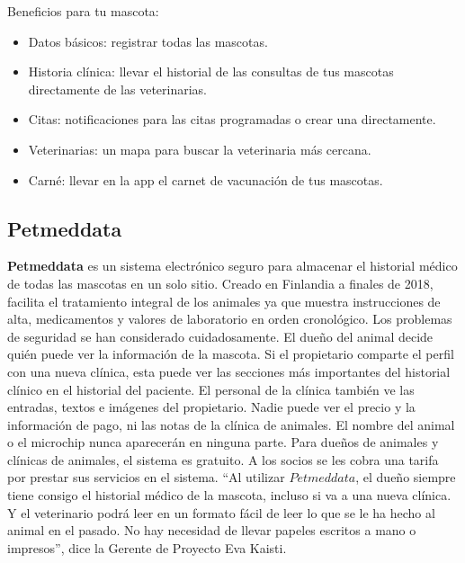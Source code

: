 Beneficios para tu mascota:
\begin{itemize}


\item	Datos básicos: registrar todas las mascotas.
\item	Historia clínica: llevar el historial de las consultas de tus mascotas directamente de las veterinarias.
\item	Citas: notificaciones para las citas programadas o crear una directamente.
\item	Veterinarias: un mapa para buscar la veterinaria más cercana.
\item	Carné: llevar en la app el carnet de vacunación de tus mascotas.
\end{itemize}


\subsection{Petmeddata}\label{chapter:introduction}


\textbf{Petmeddata}  es un sistema electrónico seguro para almacenar el historial médico de todas las mascotas en un solo sitio. Creado en Finlandia a finales de 2018, facilita el tratamiento integral de los animales ya que muestra instrucciones de alta, medicamentos y valores de laboratorio en orden cronológico. Los problemas de seguridad se han considerado cuidadosamente. El dueño del animal decide quién puede ver la información de la mascota. Si el propietario comparte el perfil con una nueva clínica, esta puede ver las secciones más importantes del historial clínico en el historial del paciente. El personal de la clínica también ve las entradas, textos e imágenes del propietario. Nadie puede ver el precio y la información de pago, ni las notas de la clínica de animales. El nombre del animal o el microchip nunca aparecerán en ninguna parte. Para dueños de animales y clínicas de animales, el sistema es gratuito. A los socios se les cobra una tarifa por prestar sus servicios en el sistema.
“Al utilizar $Petmeddata$, el dueño siempre tiene consigo el historial médico de la mascota, incluso si va a una nueva clínica. Y el veterinario podrá leer en un formato fácil de leer lo que se le ha hecho al animal en el pasado. No hay necesidad de llevar papeles escritos a mano o impresos”, dice la Gerente de Proyecto Eva Kaisti.

